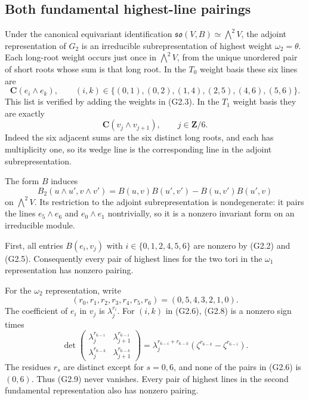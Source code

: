 \documentclass[11pt,a4paper]{article}
\theoremstyle{definition}\newtheorem{definition}[theorem]{Definition}
\theoremstyle{remark}\newtheorem{remark}[theorem]{Remark}
\begin{document}
\subsection{Both fundamental highest-line pairings}
Under the canonical equivariant identification
$\mathfrak{so}(V,B)\simeq\bigwedge^2V$, the adjoint
representation of $G_2$ is an irreducible subrepresentation
of highest weight $\omega_2=\theta$.  Each long-root weight
occurs just once in $\bigwedge^2V$, from the unique unordered
pair of short roots whose sum is that long root.  In the
$T_0$ weight basis these six lines are
\[
 \mathbf C(e_i\wedge e_k),\qquad
 (i,k)\in\{(0,1),(0,2),(1,4),(2,5),(4,6),(5,6)\}.
 \tag{G2.6}
\]
This list is verified by adding the weights in (G2.3).
In the $T_1$ weight basis they are exactly
\[
                         \mathbf C(v_j\wedge v_{j+1}),
                         \qquad j\in\mathbf Z/6.
 \tag{G2.7}
\]
Indeed the six adjacent sums are the six distinct long roots,
and each has multiplicity one, so its wedge line is the
corresponding line in the adjoint subrepresentation.

The form $B$ induces
\[
 B_2(u\wedge u',v\wedge v')
        =B(u,v)B(u',v')-B(u,v')B(u',v)
 \tag{G2.8}
\]
on $\bigwedge^2V$.  Its restriction to the adjoint
subrepresentation is nondegenerate: it pairs the lines
$e_5\wedge e_6$ and $e_0\wedge e_1$ nontrivially,
so it is a nonzero invariant form on an irreducible module.

First, all entries $B(e_i,v_j)$ with
$i\in\{0,1,2,4,5,6\}$ are nonzero by (G2.2) and (G2.5).
Consequently every pair of highest lines for the two tori in
the $\omega_1$ representation has nonzero pairing.

For the $\omega_2$ representation, write
\[
 (r_0,r_1,r_2,r_3,r_4,r_5,r_6)=(0,5,4,3,2,1,0).
\]
The coefficient of $e_i$ in $v_j$ is $\lambda_j^{r_i}$.
For $(i,k)$ in (G2.6), (G2.8) is a nonzero sign times
\[
 \det\begin{pmatrix}
  \lambda_j^{r_{6-i}}&\lambda_{j+1}^{r_{6-i}}\\
  \lambda_j^{r_{6-k}}&\lambda_{j+1}^{r_{6-k}}
 \end{pmatrix}
  =\lambda_j^{r_{6-i}+r_{6-k}}
        (\zeta^{r_{6-k}}-\zeta^{r_{6-i}}).
 \tag{G2.9}
\]
The residues $r_s$ are distinct except for $s=0,6$,
and none of the pairs in (G2.6) is $(0,6)$.
Thus (G2.9) never vanishes.  Every pair of highest lines
in the second fundamental representation also has nonzero
pairing.
\end{document}
